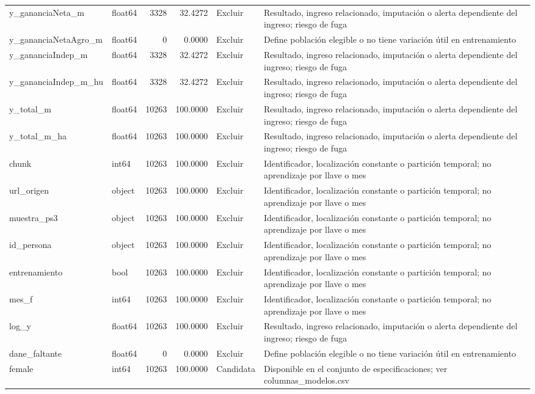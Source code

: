 \begin{longtable}{llrrll}
y\_gananciaNeta\_m & float64 & 3328 & 32.4272 & Excluir & Resultado, ingreso relacionado, imputación o alerta dependiente del ingreso; riesgo de fuga \\
y\_gananciaNetaAgro\_m & float64 & 0 & 0.0000 & Excluir & Define población elegible o no tiene variación útil en entrenamiento \\
y\_gananciaIndep\_m & float64 & 3328 & 32.4272 & Excluir & Resultado, ingreso relacionado, imputación o alerta dependiente del ingreso; riesgo de fuga \\
y\_gananciaIndep\_m\_hu & float64 & 3328 & 32.4272 & Excluir & Resultado, ingreso relacionado, imputación o alerta dependiente del ingreso; riesgo de fuga \\
y\_total\_m & float64 & 10263 & 100.0000 & Excluir & Resultado, ingreso relacionado, imputación o alerta dependiente del ingreso; riesgo de fuga \\
y\_total\_m\_ha & float64 & 10263 & 100.0000 & Excluir & Resultado, ingreso relacionado, imputación o alerta dependiente del ingreso; riesgo de fuga \\
chunk & int64 & 10263 & 100.0000 & Excluir & Identificador, localización constante o partición temporal; no aprendizaje por llave o mes \\
url\_origen & object & 10263 & 100.0000 & Excluir & Identificador, localización constante o partición temporal; no aprendizaje por llave o mes \\
muestra\_ps3 & object & 10263 & 100.0000 & Excluir & Identificador, localización constante o partición temporal; no aprendizaje por llave o mes \\
id\_persona & object & 10263 & 100.0000 & Excluir & Identificador, localización constante o partición temporal; no aprendizaje por llave o mes \\
entrenamiento & bool & 10263 & 100.0000 & Excluir & Identificador, localización constante o partición temporal; no aprendizaje por llave o mes \\
mes\_f & int64 & 10263 & 100.0000 & Excluir & Identificador, localización constante o partición temporal; no aprendizaje por llave o mes \\
log\_y & float64 & 10263 & 100.0000 & Excluir & Resultado, ingreso relacionado, imputación o alerta dependiente del ingreso; riesgo de fuga \\
dane\_faltante & float64 & 0 & 0.0000 & Excluir & Define población elegible o no tiene variación útil en entrenamiento \\
female & int64 & 10263 & 100.0000 & Candidata & Disponible en el conjunto de especificaciones; ver columnas\_modelos.csv \\

\end{longtable}
